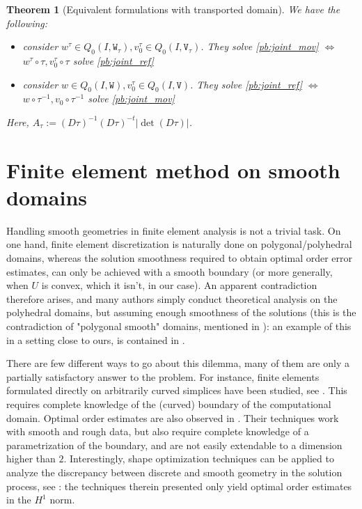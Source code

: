 \documentclass[english,a4paper,9pt,oneside]{scrbook}	%
\theoremstyle{break}
\newtheorem{thm}[equation]{Theorem}
\theoremstyle{remark}
\newcommand{\tw}[1]{\texttt{#1}}
\begin{document}
\begin{appendices}
\begin{thm}[Equivalent formulations with transported domain]
We have the following:

\begin{itemize}
	\item consider $w^\tau \in Q_0(I, \tw{W}_\tau), v_0^\tau \in Q_0(I,\tw{V}_\tau)$. They solve \cref{pb:joint_mov} $\iff$ $w^\tau\circ \tau , v_0^\tau\circ \tau $ solve \cref{pb:joint_ref}
	\item consider $w \in Q_0(I, \tw{W}), v_0^\tau \in Q_0(I,\tw{V})$. They solve \cref{pb:joint_ref} $\iff$ $w\circ \tau^{-1}, v_0\circ \tau^{-1}$ solve \cref{pb:joint_mov} 

\end{itemize}

Here, $A_\tau:=  (D\tau)^{-1}(D\tau)^{-t}|\det(D\tau)|$.

\end{thm}

\chapter{Finite element method on smooth domains}
\label{chap:inh_fem}
Handling smooth geometries in finite element analysis is not a trivial task. On one hand, finite element discretization is naturally done on polygonal/polyhedral domains, whereas the solution smoothness required to obtain optimal order error estimates, can only be achieved with a smooth boundary (or more generally, when $U$ is convex, which it isn't, in our case). An apparent contradiction therefore arises, and many authors simply conduct theoretical analysis on the polyhedral domains, but assuming enough smoothness of the solutions (this is the contradiction of "polygonal smooth" domains, mentioned in \cite{tiihonen}): an example of this in a setting close to ours, is contained in \cite{paganini}. 

There are few different ways to go about this dilemma, many of them are only a partially satisfactory answer to the problem. For instance, finite elements formulated directly on arbitrarily curved simplices have been studied, see \cite{zlamal}. This requires complete knowledge of the (curved) boundary of the computational domain. Optimal order estimates are also observed in \cite{bramble}. Their techniques work with smooth and rough data, but also require complete knowledge of a parametrization of the boundary, and are not easily extendable to a dimension higher than $2$. Interestingly, shape optimization techniques can be applied to analyze the discrepancy between discrete and smooth geometry in the solution process, see \cite{tiihonen}: the techniques therein presented only yield optimal order estimates in the $H^1$ norm.


\end{appendices}
\end{document}
